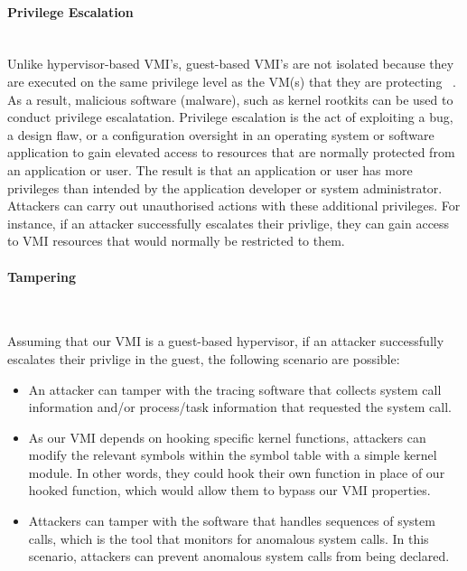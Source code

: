 \documentclass{report}
\begin{document}
\begin{spacing}{1.5}
\paragraph{Privilege Escalation}\mbox{}\\

{\large
Unlike hypervisor-based VMI's, guest-based VMI's are not isolated because they are executed on the same privilege level as the VM(s) that they are protecting ~\cite{10.1145/2775111}. As a result, malicious software (malware), such as kernel rootkits can be used to conduct privilege escalatation. Privilege escalation is the act of exploiting a bug, a design flaw, or a configuration oversight in an operating system or software application to gain elevated access to resources that are normally protected from an application or user. The result is that an application or user has more privileges than intended by the application developer or system administrator. Attackers can carry out unauthorised actions with these additional privileges. For instance, if an attacker successfully escalates their privlige, they can gain access to VMI resources that would normally be restricted to them.
\newline
}

\paragraph{Tampering}\mbox{}\\


{\large
Assuming that our VMI is a guest-based hypervisor, if an attacker successfully escalates their privlige in the guest, the following scenario are possible:

\begin{itemize}
\item An attacker can tamper with the tracing software that collects system call information and/or process/task information that requested the system call. 

\item As our VMI depends on hooking specific kernel functions, attackers can modify the relevant symbols within the symbol table with a simple kernel module. In other words, they could hook their own function in place of our hooked function, which would allow them to bypass our VMI properties. 

\item Attackers can tamper with the software that handles sequences of system calls, which is the tool that monitors for anomalous system calls. In this scenario, attackers can prevent anomalous system calls from being declared.


\end{itemize}}
\end{spacing}
\end{document}
